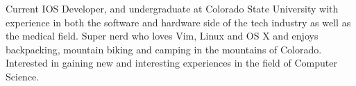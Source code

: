 

\begin{cvparagraph}

Current IOS Developer, and undergraduate at Colorado State University with experience in both the software and hardware side of the tech industry as well as the medical field. Super nerd who loves Vim, Linux and OS X and enjoys backpacking, mountain biking and camping in the mountains of Colorado. Interested in gaining new and interesting experiences in the field of Computer Science.
\end{cvparagraph}
